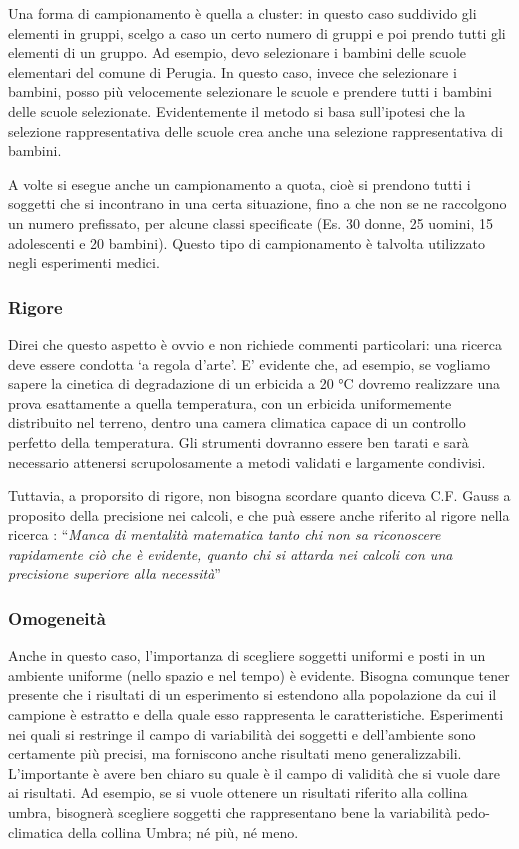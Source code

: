 \documentclass[a4paper,12pt,oneside]{book}
\begin{document}
Una forma di campionamento è quella a cluster: in questo caso suddivido
gli elementi in gruppi, scelgo a caso un certo numero di gruppi e poi
prendo tutti gli elementi di un gruppo. Ad esempio, devo selezionare i
bambini delle scuole elementari del comune di Perugia. In questo caso,
invece che selezionare i bambini, posso più velocemente selezionare le
scuole e prendere tutti i bambini delle scuole selezionate.
Evidentemente il metodo si basa sull'ipotesi che la selezione
rappresentativa delle scuole crea anche una selezione rappresentativa di
bambini.

A volte si esegue anche un campionamento a quota, cioè si prendono tutti
i soggetti che si incontrano in una certa situazione, fino a che non se
ne raccolgono un numero prefissato, per alcune classi specificate (Es.
30 donne, 25 uomini, 15 adolescenti e 20 bambini). Questo tipo di
campionamento è talvolta utilizzato negli esperimenti medici.

\subsubsection{Rigore}\label{rigore}

Direi che questo aspetto è ovvio e non richiede commenti particolari:
una ricerca deve essere condotta `a regola d'arte'. E' evidente che, ad
esempio, se vogliamo sapere la cinetica di degradazione di un erbicida a
20 °C dovremo realizzare una prova esattamente a quella temperatura, con
un erbicida uniformemente distribuito nel terreno, dentro una camera
climatica capace di un controllo perfetto della temperatura. Gli
strumenti dovranno essere ben tarati e sarà necessario attenersi
scrupolosamente a metodi validati e largamente condivisi.

Tuttavia, a proporsito di rigore, non bisogna scordare quanto diceva
C.F. Gauss a proposito della precisione nei calcoli, e che puà essere
anche riferito al rigore nella ricerca : ``\emph{Manca di mentalità
matematica tanto chi non sa riconoscere rapidamente ciò che è evidente,
quanto chi si attarda nei calcoli con una precisione superiore alla
necessità}''

\subsubsection{Omogeneità}\label{omogeneita}

Anche in questo caso, l'importanza di scegliere soggetti uniformi e
posti in un ambiente uniforme (nello spazio e nel tempo) è evidente.
Bisogna comunque tener presente che i risultati di un esperimento si
estendono alla popolazione da cui il campione è estratto e della quale
esso rappresenta le caratteristiche. Esperimenti nei quali si restringe
il campo di variabilità dei soggetti e dell'ambiente sono certamente più
precisi, ma forniscono anche risultati meno generalizzabili.
L'importante è avere ben chiaro su quale è il campo di validità che si
vuole dare ai risultati. Ad esempio, se si vuole ottenere un risultati
riferito alla collina umbra, bisognerà scegliere soggetti che
rappresentano bene la variabilità pedo-climatica della collina Umbra; né
più, né meno.
\end{document}
